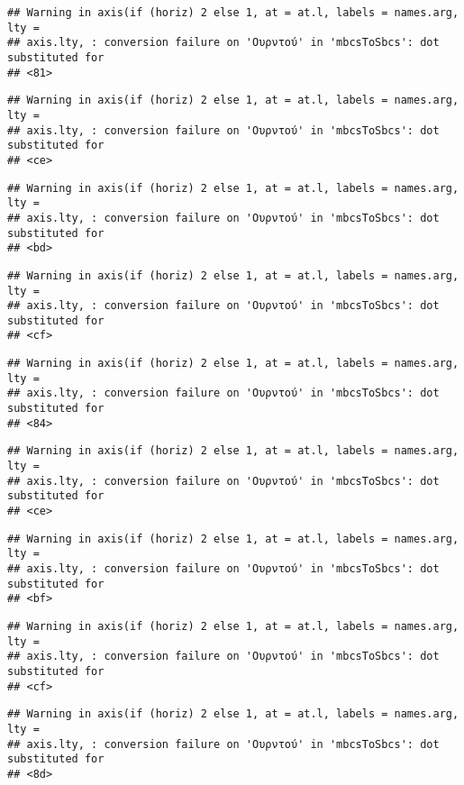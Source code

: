 \documentclass[
]{article}
\begin{document}
\begin{verbatim}
## Warning in axis(if (horiz) 2 else 1, at = at.l, labels = names.arg, lty =
## axis.lty, : conversion failure on 'Ουρντού' in 'mbcsToSbcs': dot substituted for
## <81>
\end{verbatim}

\begin{verbatim}
## Warning in axis(if (horiz) 2 else 1, at = at.l, labels = names.arg, lty =
## axis.lty, : conversion failure on 'Ουρντού' in 'mbcsToSbcs': dot substituted for
## <ce>
\end{verbatim}

\begin{verbatim}
## Warning in axis(if (horiz) 2 else 1, at = at.l, labels = names.arg, lty =
## axis.lty, : conversion failure on 'Ουρντού' in 'mbcsToSbcs': dot substituted for
## <bd>
\end{verbatim}

\begin{verbatim}
## Warning in axis(if (horiz) 2 else 1, at = at.l, labels = names.arg, lty =
## axis.lty, : conversion failure on 'Ουρντού' in 'mbcsToSbcs': dot substituted for
## <cf>
\end{verbatim}

\begin{verbatim}
## Warning in axis(if (horiz) 2 else 1, at = at.l, labels = names.arg, lty =
## axis.lty, : conversion failure on 'Ουρντού' in 'mbcsToSbcs': dot substituted for
## <84>
\end{verbatim}

\begin{verbatim}
## Warning in axis(if (horiz) 2 else 1, at = at.l, labels = names.arg, lty =
## axis.lty, : conversion failure on 'Ουρντού' in 'mbcsToSbcs': dot substituted for
## <ce>
\end{verbatim}

\begin{verbatim}
## Warning in axis(if (horiz) 2 else 1, at = at.l, labels = names.arg, lty =
## axis.lty, : conversion failure on 'Ουρντού' in 'mbcsToSbcs': dot substituted for
## <bf>
\end{verbatim}

\begin{verbatim}
## Warning in axis(if (horiz) 2 else 1, at = at.l, labels = names.arg, lty =
## axis.lty, : conversion failure on 'Ουρντού' in 'mbcsToSbcs': dot substituted for
## <cf>
\end{verbatim}

\begin{verbatim}
## Warning in axis(if (horiz) 2 else 1, at = at.l, labels = names.arg, lty =
## axis.lty, : conversion failure on 'Ουρντού' in 'mbcsToSbcs': dot substituted for
## <8d>
\end{verbatim}
\end{document}
